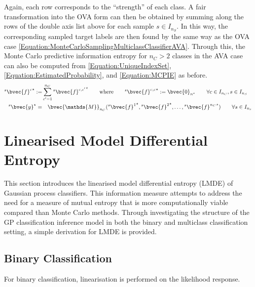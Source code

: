 				Again, each row corresponds to the ``strength'' of each class. A fair transformation into the OVA form can then be obtained by summing along the rows of the double axis list above for each sample $s \in I_{n_{S}}$. In this way, the corresponding sampled target labels are then found by the same way as the OVA case \eqref{Equation:MonteCarloSamplingMulticlassClassifierAVA}. Through this, the Monte Carlo predictive information entropy for $n_{C} > 2$ classes in the AVA case can also be computed from \eqref{Equation:UniqueIndexSet}, \eqref{Equation:EstimatedProbability}, and \eqref{Equation:MCPIE} as before. \begin{equation}
					\begin{aligned}
						{^{s}}{\bvec{f}^{c}}^{\star} :=& \sum_{c' = 1}^{n_{C}} {^{s}}{\bvec{f}^{c, c'}}^{\star} \qquad \text{where} \qquad {^{s}}{\bvec{f}^{c, c}}^{\star} := \bvec{0}_{n^{\star}} \qquad \forall c \in I_{n_{C}}, s \in I_{n_{S}} \\
						{^{s}}\bvec{y}^{\star} =& \quad \bvec{\mathds{M}}_{n_{C}}({^{s}}{\bvec{f}^{1}}^{\star}, {^{s}}{\bvec{f}^{2}}^{\star}, \dots, {^{s}}{\bvec{f}^{n_{C}}}^{\star}) \qquad \forall s \in I_{n_{s}}
					\end{aligned}
				\label{Equation:MonteCarloSamplingMulticlassClassifierAVA}
				\end{equation}
					
	\section{Linearised Model Differential Entropy}
	\label{InformativeSeafloorExploration:LMDE}
	
		This section introduces the linearised model differential entropy (LMDE) of Gaussian process classifiers. This information measure attempts to address the need for a measure of mutual entropy that is more computationally viable compared than Monte Carlo methods. Through investigating the structure of the GP classification inference model in both the binary and multiclass classification setting, a simple derivation for LMDE is provided.
		
		\subsection{Binary Classification}
		\label{InformativeSeafloorExploration:LMDE:Binary}
		
			For binary classification, linearisation is performed on the likelihood response.
					
